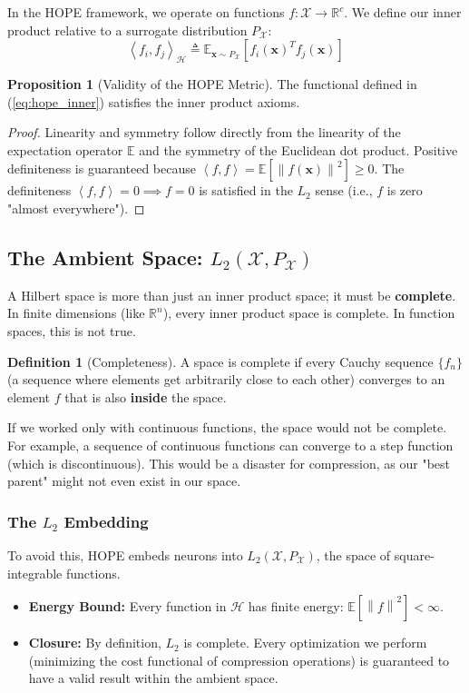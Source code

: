 \documentclass[11pt, a4paper, copyright, gdm]{google}
\newcommand{\norm}[1]{\left\lVert#1\right\rVert}
\newcommand{\inner}[2]{\left\langle#1, #2\right\rangle}
\newcommand{\xVect}{\boldsymbol{x}}
\newcommand{\calH}{\mathcal{H}}
\newcommand{\calX}{\mathcal{X}}
\newcommand{\R}{\mathbb{R}}
\newcommand{\E}{\mathbb{E}}
\theoremstyle{definition}
\newtheorem{definition}{Definition}[section]
\newtheorem{proposition}[theorem]{Proposition}
\begin{document}
In the HOPE framework, we operate on functions $f: \calX \to \R^c$. We define our inner product relative to a surrogate distribution $P_{\calX}$:
\begin{equation}
    \label{eq:hope_inner}
    \inner{f_i}{f_j}_{\calH} \triangleq \E_{\xVect \sim P_{\calX}} \left[ f_i(\xVect)^T f_j(\xVect) \right]
\end{equation}

\begin{proposition}[Validity of the HOPE Metric]
The functional defined in (\ref{eq:hope_inner}) satisfies the inner product axioms.
\end{proposition}

\begin{proof}
Linearity and symmetry follow directly from the linearity of the expectation operator $\E$ and the symmetry of the Euclidean dot product. Positive definiteness is guaranteed because $\inner{f}{f} = \E[\norm{f(\xVect)}^2] \geq 0$. The definiteness $\inner{f}{f}=0 \implies f=0$ is satisfied in the $L_2$ sense (i.e., $f$ is zero "almost everywhere").
\end{proof}

\subsection{The Ambient Space: $L_2(\calX, P_{\calX})$}

A Hilbert space is more than just an inner product space; it must be \textbf{complete}. In finite dimensions (like $\R^n$), every inner product space is complete. In function spaces, this is not true.

\begin{definition}[Completeness]
A space is complete if every Cauchy sequence $\{f_n\}$ (a sequence where elements get arbitrarily close to each other) converges to an element $f$ that is also \textbf{inside} the space.
\end{definition}

If we worked only with continuous functions, the space would not be complete. For example, a sequence of continuous functions can converge to a step function (which is discontinuous). This would be a disaster for compression, as our "best parent" might not even exist in our space.

\subsubsection{The $L_2$ Embedding}
To avoid this, HOPE embeds neurons into $L_2(\calX, P_{\calX})$, the space of square-integrable functions. 
\begin{itemize}
    \item \textbf{Energy Bound:} Every function in $\calH$ has finite energy: $\E[\norm{f}^2] < \infty$.
    \item \textbf{Closure:} By definition, $L_2$ is complete. Every optimization we perform (minimizing the cost functional of compression operations) is guaranteed to have a valid result within the ambient space.
\end{itemize}
\end{document}
